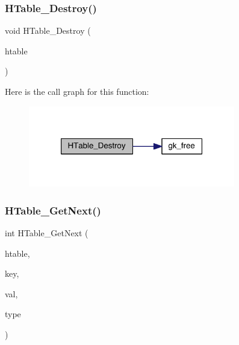\subsubsection{\texorpdfstring{H\+Table\+\_\+\+Destroy()}{HTable\_Destroy()}}
{\footnotesize\ttfamily void H\+Table\+\_\+\+Destroy (\begin{DoxyParamCaption}\item[{\hyperlink{a00650}{gk\+\_\+\+H\+Table\+\_\+t} $\ast$}]{htable }\end{DoxyParamCaption})}

Here is the call graph for this function\+:\nopagebreak
\begin{figure}[H]
\begin{center}
\leavevmode
\includegraphics[width=256pt]{a00077_a4552b6bc8e0b509913638222daecf3aa_cgraph}
\end{center}
\end{figure}
\mbox{\label{a00077_a06dc1c772847749d0af6be1ba7328e4e}} 
\subsubsection{\texorpdfstring{H\+Table\+\_\+\+Get\+Next()}{HTable\_GetNext()}}
{\footnotesize\ttfamily int H\+Table\+\_\+\+Get\+Next (\begin{DoxyParamCaption}\item[{\hyperlink{a00650}{gk\+\_\+\+H\+Table\+\_\+t} $\ast$}]{htable,  }\item[{int}]{key,  }\item[{int $\ast$}]{val,  }\item[{int}]{type }\end{DoxyParamCaption})}

